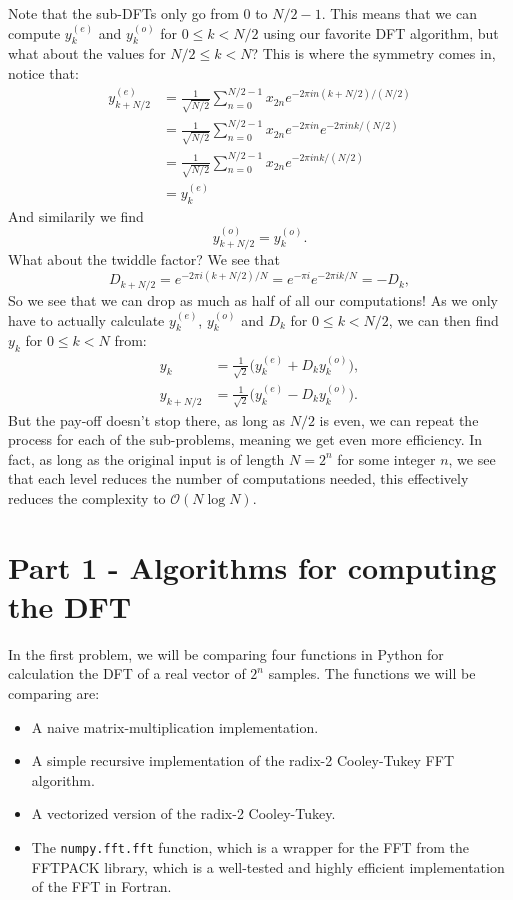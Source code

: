 \documentclass[a4paper, 11pt, notitlepage, english]{article}
\begin{document}
Note that the sub-DFTs only go from 0 to $N/2-1$. This means that we can compute $y_{k}^{(e)}$ and $y_{k}^{(o)}$ for $0\leq k < N/2$ using our favorite DFT algorithm, but what about the values for $N/2 \leq k < N$? This is where the symmetry comes in, notice that:
\begin{align}
y_{k + N/2}^{(e)}     
&= \frac{1}{\sqrt{N/2}}\sum_{n=0}^{N/2-1} x_{2n} e^{-2\pi i n(k+N/2) /(N/2)} \\
&= \frac{1}{\sqrt{N/2}}\sum_{n=0}^{N/2-1} x_{2n} e^{-2\pi i n}e^{-2\pi i nk /(N/2)}  \\ 
&= \frac{1}{\sqrt{N/2}}\sum_{n=0}^{N/2-1} x_{2n} e^{-2\pi i nk /(N/2)} \\[0.2cm]
&= y_{k}^{(e)}
\end{align}
And similarily we find
$$y_{k+N/2}^{(o)} = y_k^{(o)}.$$
What about the twiddle factor? We see that
$$D_{k+N/2} = e^{-2\pi i (k+N/2)/N} = e^{-\pi i}e^{-2\pi i k/N} = -D_{k},$$
So we see that we can drop as much as half of all our computations! As we 
only have to actually calculate $y_k^{(e)}$, $y_k^{(o)}$ and $D_k$ for $0\leq k < N/2$, we can then find $y_k$ for $0\leq k < N$ from:
\begin{align*}
y_k &= \frac{1}{\sqrt{2}}\bigg(y_k^{(e)} + D_k y_k^{(o)}\bigg), \\
y_{k+N/2} &= \frac{1}{\sqrt{2}}\bigg(y_k^{(e)} - D_k y_k^{(o)}\bigg).
\end{align*}
But the pay-off doesn't stop there, as long as $N/2$ is even, we can repeat the process for each of the sub-problems, meaning we get even more efficiency. In fact, as long as the original input is of length $N=2^n$ for some integer $n$, we see that each level reduces the number of computations needed, this effectively reduces the complexity to $\mathcal{O}(N\log N).$


\section*{Part 1 - Algorithms for computing the DFT}

In the first problem, we will be comparing four functions in Python for calculation the DFT of a real vector of $2^n$ samples. The functions we will be comparing are:
\begin{itemize}
    \item A naive matrix-multiplication implementation.
    \item A simple recursive implementation of the radix-2 Cooley-Tukey FFT algorithm.
    \item A vectorized version of the radix-2 Cooley-Tukey.
    \item The \verb+numpy.fft.fft+ function, which is a wrapper for the FFT from the FFTPACK library, which is a well-tested and highly efficient implementation of the FFT in Fortran.
\end{itemize}
\end{document}
